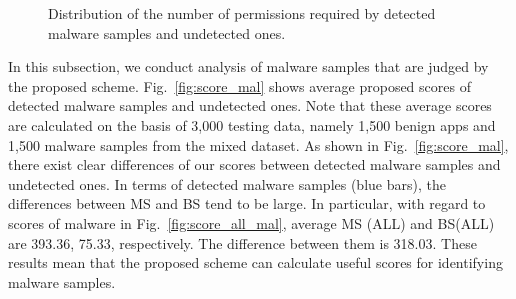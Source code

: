 \documentclass{ieeeaccess}
\newcommand{\myfigurename}{Fig.}
\begin{document}
\begin{figure}[t]
{  } 
  \caption{Distribution of the number of permissions required by detected malware samples and undetected ones.}
  \label{fig:permission_distribution_mal}
\end{figure}
In this subsection, we conduct analysis of malware samples that are judged by the proposed scheme.
\myfigurename~\ref{fig:score_mal} shows average proposed scores of detected malware samples and undetected ones.
Note that these average scores are calculated on the basis of 3,000 testing data, namely 1,500 benign apps and 1,500 malware samples from the mixed dataset.
As shown in \myfigurename~\ref{fig:score_mal}, there exist clear differences of our scores between detected malware samples and undetected ones.
In terms of detected malware samples (blue bars), the differences between MS and BS tend to be large. 
In particular, with regard to scores of malware in \myfigurename~\ref{fig:score_all_mal}, average MS (ALL) and BS(ALL) are 393.36, 75.33, respectively.
The difference between them is 318.03.
These results mean that the proposed scheme can calculate useful scores for identifying malware samples.
\end{document}
